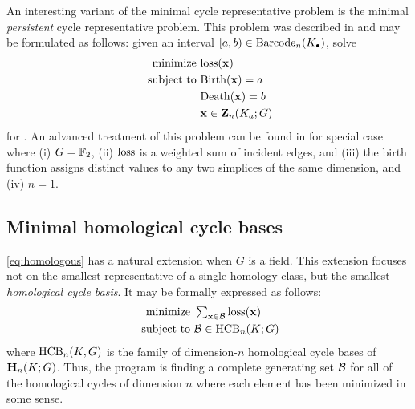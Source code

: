An interesting variant of the minimal cycle representative problem is the minimal \emph{persistent} cycle representative problem.  This problem was described in  \cite{chenquantifying} and may be formulated as follows:  given an interval $[a,b) \in \mathrm{Barcode}_n(K_\bullet)$, solve 
\begin{align}
   \begin{split}
    \text{minimize } & \mathrm{loss}(\mathbf{x}) \\
    \text{ subject to } & \mathrm{Birth}(\mathbf{x}) = a \\
    & \mathrm{Death}(\mathbf{x}) = b \\
    & \mathbf{x} \in \mathbf{Z}_n(K_a; G)
   \end{split}
   \label{eq:minbarcoderep}
\end{align}
for \DIFdelbegin {}\DIFdelend \DIFaddbegin \DIFadd{$\optimalrep$}\DIFaddend .  An advanced treatment of this problem can be found in \cite{chenquantifying} for special case where (i)  $G = \mathbb{F}_2$, (ii) $\mathrm{loss}$ is a weighted sum of incident edges,  and (iii) the birth function assigns distinct values to any two simplices of the same dimension, and (iv) $n=1$.  


\subsection{Minimal homological cycle bases}

\pr \eqref{eq:homologous} has a natural extension when $G$ is a field.  This extension focuses not on the smallest representative of a single homology class, but the smallest  \emph{homological cycle basis}.  It may be formally expressed as follows:
\begin{align}
   \begin{split}
    \text{minimize } & \textstyle \sum_{\mathbf{x} \in \mathcal B} \mathrm{loss}(\mathbf{x}) \\
    \text{ subject to } & \mathcal B \in \mathrm{HCB}_n(K ; G)
   \end{split}
   \label{eq:generalminimalbasis}
\end{align}
where $\mathrm{HCB}_n(K, G)$ is the family of dimension-$n$ homological cycle bases of $\mathbf{H}_n(K;G)$. Thus, the program is finding a complete generating set $\mathcal B$ for all of the homological cycles of dimension $n$ where each element has been minimized in some sense.  

